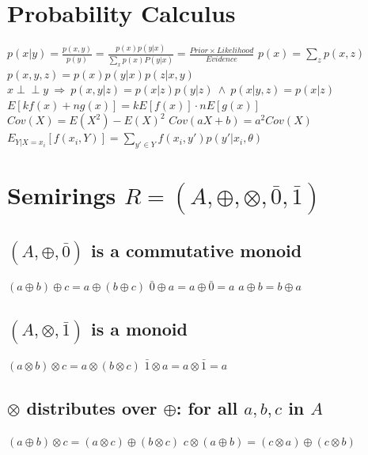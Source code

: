 \documentclass[a4paper, 11pt, landscape]{article}
\begin{document}
\begin{multicols*}{3}

\section{Probability Calculus}
$p(x|y)=\frac{p(x, y)}{p(y)}=\frac{p(x)p(y|x)}{\sum_{x}p(x)P(y|x)}=\frac{Prior \times Likelihood}{Evidence}$\newline
$p(x)=\sum\limits_{z}{p(x,z)}$\qquad
$p(x,y,z)=p(x)p(y|x)p(z|x,y)$\newline
$x \perp \!\!\!\!\! \perp y\ \Rightarrow\ p(x,y|z)=p(x|z)p(y|z)\ \wedge\ p(x|y,z)=p(x|z)$\newline
$E[kf(x)+ng(x)]=kE[f(x)]\cdot nE[g(x)]$\newline
$Cov(X)=E(X^2)-E(X)^2$ \qquad $Cov(aX+b)=a^2 Cov(X)$\newline
$E_{Y|X=x_i}[f(x_i,Y)]=\sum_{y'\in Y}f(x_i,y')p(y'|x_i,\theta)$

\section{Semirings $R=(A,\oplus,\otimes,\bar{0},\bar{1})$}
\subsection{$(A,\oplus,\bar{0})$ is a commutative monoid}
$(a\oplus b)\oplus c = a\oplus (b\oplus c)$
$\bar{0}\oplus a = a \oplus \bar{0} = a$
$a\oplus b = b \oplus a$

\subsection{$(A,\otimes,\bar{1})$ is a monoid}
$(a\otimes b)\otimes c = a \otimes (b \otimes c)$ \phantom{2. }$\bar{1}\otimes a = a \otimes \bar{1} = a$

\subsection{$\otimes$ distributes over $\oplus$: for all $a,b,c$ in $A$} 
$(a \oplus b)\otimes c = (a \otimes c) \oplus (b \otimes c)$ \newline
$c \otimes (a \oplus b) = (c \otimes a) \oplus (c \otimes b)$


\end{multicols*}
\end{document}
